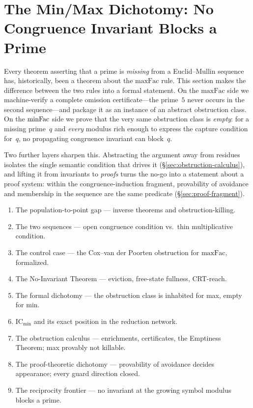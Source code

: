 \section{The Min/Max Dichotomy: No Congruence Invariant Blocks a Prime}
\label{sec:min-max-dichotomy}

Every theorem asserting that a prime is \emph{missing} from a
Euclid--Mullin sequence has, historically, been a theorem about the
$\mathrm{maxFac}$ rule.  This section makes the difference between the
two rules into a formal statement.  On the $\mathrm{maxFac}$ side we
machine-verify a complete omission certificate---the prime~$5$ never
occurs in the second sequence---and package it as an instance of an
abstract obstruction class.  On the $\mathrm{minFac}$ side we prove that the
very same obstruction class is \emph{empty}: for a missing prime~$q$
and \emph{every} modulus rich enough to express the capture condition
for~$q$, no propagating congruence invariant can block~$q$.

Two further layers sharpen this.  Abstracting the argument away from
residues isolates the single semantic condition that drives it
(\S\ref{sec:obstruction-calculus}), and lifting it from invariants to
\emph{proofs} turns the no-go into a statement about a proof system:
within the congruence-induction fragment, provability of avoidance and
membership in the sequence are the same predicate
(\S\ref{sec:proof-fragment}).

\begin{roadmap}
\begin{enumerate}[nosep,leftmargin=*]
\item[\S\ref{sec:pop-to-point}] The population-to-point gap --- inverse theorems and obstruction-killing.
\item[\S\ref{sec:two-sequences}] The two sequences --- open congruence condition vs.\ thin multiplicative condition.
\item[\S\ref{sec:cvdp-control}] The control case --- the Cox--van der Poorten obstruction for $\mathrm{maxFac}$, formalized.
\item[\S\ref{sec:no-invariant}] The No-Invariant Theorem --- eviction, free-state fullness, CRT-reach.
\item[\S\ref{sec:formal-dichotomy}] The formal dichotomy --- the obstruction class is inhabited for max, empty for min.
\item[\S\ref{sec:ic-min}] $\mathrm{IC}_{\min}$ and its exact position in the reduction network.
\item[\S\ref{sec:obstruction-calculus}] The obstruction calculus --- enrichments, certificates, the Emptiness Theorem; max provably not killable.
\item[\S\ref{sec:proof-fragment}] The proof-theoretic dichotomy --- provability of avoidance decides appearance; every guard direction closed.
\item[\S\ref{sec:reciprocity-frontier}] The reciprocity frontier --- no invariant at the growing symbol modulus blocks a prime.
\end{enumerate}
\end{roadmap}

